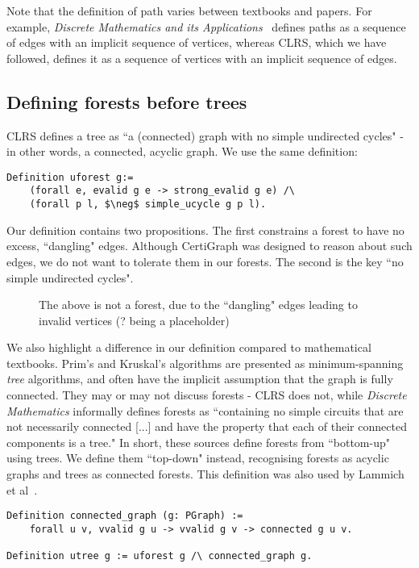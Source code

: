 Note that the definition of path varies between textbooks and papers. For example, \textit{Discrete Mathematics and its Applications}~\cite{rozen} defines paths as a sequence of edges with an implicit sequence of vertices, whereas CLRS, which we have followed, defines it as a sequence of vertices with an implicit sequence of edges.

\subsection{Defining forests before trees}

CLRS defines a tree as ``a (connected) graph with no simple undirected cycles" - in other words, a connected, acyclic graph. We use the same definition:
\begin{lstlisting}
Definition uforest g:=
	(forall e, evalid g e -> strong_evalid g e) /\
	(forall p l, $\neg$ simple_ucycle g p l).
\end{lstlisting}
Our definition contains two propositions. The first constrains a forest to have no excess, ``dangling" edges. Although CertiGraph was designed to reason about such edges, we do not want to tolerate them in our forests. The second is the key ``no simple undirected cycles".
\begin{figure}[H]
	\caption{The above is not a forest, due to the ``dangling" edges leading to invalid vertices (? being a placeholder)}
\end{figure}
We also highlight a difference in our definition compared to mathematical textbooks. Prim's and Kruskal's algorithms are presented as minimum-spanning \textit{tree} algorithms, and often have the implicit assumption that the graph is fully connected. They may or may not discuss forests - CLRS does not, while \textit{Discrete Mathematics} informally defines forests as ``containing no simple circuits that are not necessarily connected [...] and have the property that each of their connected components is a tree." In short, these sources define forests from ``bottom-up" using trees. We define them ``top-down" instead, recognising forests as acyclic graphs and trees as connected forests. This definition was also used by Lammich et al~\cite{DBLP:journals/afp/LammichN19}.
\begin{lstlisting}
Definition connected_graph (g: PGraph) :=
	forall u v, vvalid g u -> vvalid g v -> connected g u v.

Definition utree g := uforest g /\ connected_graph g.
\end{lstlisting}